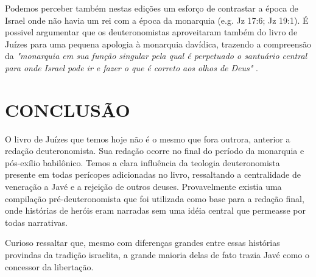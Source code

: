 \documentclass[
    article,            %
	12pt,				%
	oneside,			%
	a4paper,			%
	english,			%
	french,				%
	spanish,			%
	brazil				%
	]{abntex2}
\begin{document}
Podemos perceber também nestas edições um esforço de contrastar a época de Israel onde não havia um rei com a época da monarquia (e.g. Jz 17:6; Jz 19:1). É possivel argumentar que os deuteronomistas aproveitaram também do livro de Juízes para uma pequena apologia à monarquia davídica, trazendo a compreensão da \emph{"monarquia em sua função singular pela qual é perpetuado o santuário central para onde Israel pode ir e fazer o que é correto aos olhos de Deus"} \cite[p.177]{LASOR}.


\section{CONCLUSÃO}
O livro de Juízes que temos hoje não é o mesmo que fora outrora, anterior a redação deuteronomista. Sua redação ocorre no final do período da monarquia e pós-exílio babilônico. Temos a clara influência da teologia deuteronomista presente em todas perícopes adicionadas no livro, ressaltando a centralidade de veneração a Javé e a rejeição de outros deuses. Provavelmente existia uma compilação pré-deuteronomista que foi utilizada como base para a redação final, onde histórias de heróis eram narradas sem uma idéia central que permeasse por todas narrativas.

Curioso ressaltar que, mesmo com diferenças grandes entre essas histórias provindas da tradição israelita, a grande maioria delas de fato trazia Javé como o concessor da libertação.

\pagebreak

\end{document}
